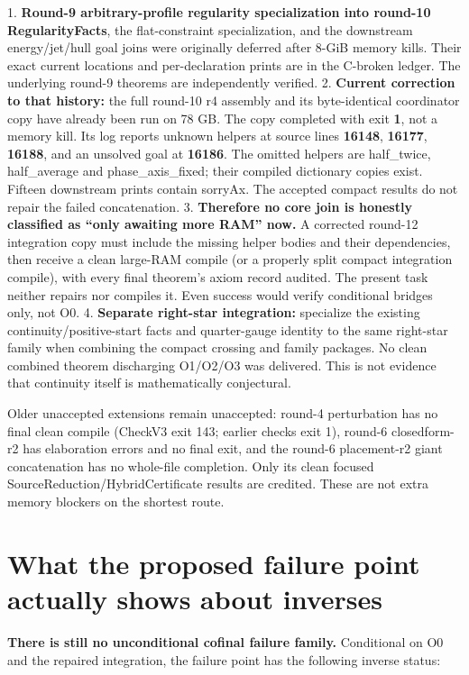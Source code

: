 1. \textbf{Round-9 arbitrary-profile regularity specialization into round-10 RegularityFacts}, the flat-constraint specialization, and the downstream energy/jet/hull goal joins were originally deferred after 8-GiB memory kills. Their exact current locations and per-declaration prints are in the C-broken ledger. The underlying round-9 theorems are independently verified.
2. \textbf{Current correction to that history:} the full round-10 r4 assembly and its byte-identical coordinator copy have already been run on 78 GB. The copy completed with exit \textbf{1}, not a memory kill. Its log reports unknown helpers at source lines \textbf{16148}, \textbf{16177}, \textbf{16188}, and an unsolved goal at \textbf{16186}. The omitted helpers are half\_twice, half\_average and phase\_axis\_fixed; their compiled dictionary copies exist. Fifteen downstream prints contain sorryAx. The accepted compact results do not repair the failed concatenation.
3. \textbf{Therefore no core join is honestly classified as “only awaiting more RAM” now.} A corrected round-12 integration copy must include the missing helper bodies and their dependencies, then receive a clean large-RAM compile (or a properly split compact integration compile), with every final theorem's axiom record audited. The present task neither repairs nor compiles it. Even success would verify conditional bridges only, not O0.
4. \textbf{Separate right-star integration:} specialize the existing continuity/positive-start facts and quarter-gauge identity to the same right-star family when combining the compact crossing and family packages. No clean combined theorem discharging O1/O2/O3 was delivered. This is not evidence that continuity itself is mathematically conjectural.

Older unaccepted extensions remain unaccepted: round-4 perturbation has no final clean compile (CheckV3 exit 143; earlier checks exit 1), round-6 closedform-r2 has elaboration errors and no final exit, and the round-6 placement-r2 giant concatenation has no whole-file completion. Only its clean focused SourceReduction/HybridCertificate results are credited. These are not extra memory blockers on the shortest route.

\section{What the proposed failure point actually shows about inverses}

\textbf{There is still no unconditional cofinal failure family.} Conditional on O0 and the repaired integration, the failure point has the following inverse status:

